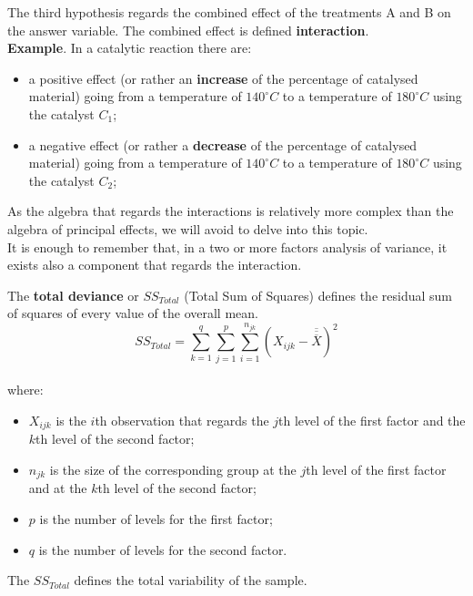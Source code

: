\begin{frame}
  \begin{small}
    The third hypothesis regards the combined effect of the treatments A and B on the answer variable. The combined effect is defined \textbf{interaction}.\\
    \vspace*{.2cm}
    \textbf{Example}. In a catalytic reaction there are:
    \begin{itemize}
      \item a positive effect (or rather an \textbf{increase} of the percentage of catalysed material) going from a temperature of $140^\circ C$ to a temperature of $180^\circ C$ using the catalyst {\boldmath$C_1$};
      \vspace*{.2cm}
      \item a negative effect (or rather a \textbf{decrease} of the percentage of catalysed material)  going from a temperature of $140^\circ C$ to a temperature of $180^\circ C$ using the catalyst {\boldmath$C_2$};
    \end{itemize}
    \vspace*{.2cm}
    As the algebra that regards the interactions is relatively more complex than the algebra of principal effects, we will avoid to delve into this topic.\\
    \vspace*{.2cm}
    It is enough to remember that, in a two or more factors analysis of variance, it exists also a component that regards the interaction.
  \end{small}
\end{frame}


\begin{frame}
  \vspace*{.25cm} 
  The \textbf{total deviance} or {\boldmath$SS_{Total}$} (Total Sum of Squares) defines the residual sum of squares of every value of the overall mean.
  $$ SS_{Total} = \sum_{k=1}^q \sum_{j=1}^p \sum_{i=1}^{n_{jk}}{(X_{ijk}-\overline{\overline{\overline{X}}})^2} $$ \\
  \vspace{-0.3cm}
  where:\\
  \vspace{-0.3cm}
  \begin{itemize}
    \item $ X_{ijk} $ is the $ i $th observation that regards the $ j $th level of the first factor and the $ k $th level of the second factor;
    \item $ n_{jk} $ is the size of the corresponding group at the $ j $th level of the first factor and at the $ k $th level of the second factor;
    \item $ p $ is the number of levels for the first factor;
    \item $ q $ is the number of levels for the second factor.
  \end{itemize}
  The {\boldmath$SS_{Total}$} defines the total variability of the sample.\\
\end{frame}

